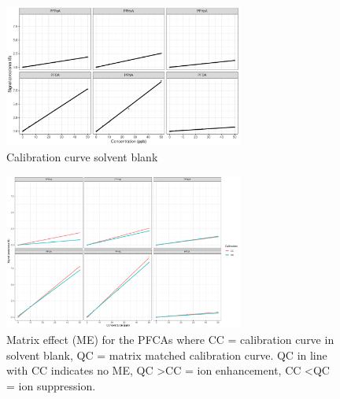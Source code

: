 \begin{figure}
    \centering
    \includegraphics[width=0.7\textwidth]{R/figs/CC_all.pdf}
    \caption{Calibration curve solvent blank}
    \label{appfig:CC}
\end{figure}


\begin{figure}
    \centering
    \includegraphics[width=0.7\textwidth]{R/figs/CCQC_matrixeffect.pdf}
    \caption{Matrix effect (ME) for the PFCAs where CC = calibration curve in solvent blank, QC = matrix matched calibration curve. QC in line with CC indicates no ME, QC \textgreater CC = ion enhancement, CC \textless QC = ion suppression.}
    \label{appfig:ME}
\end{figure}